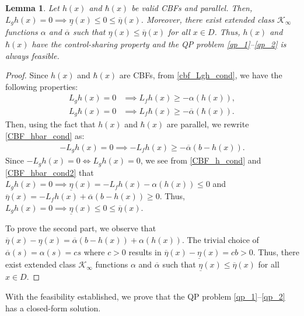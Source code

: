 \documentclass[letterpaper, 10 pt, conference]{ieeeconf}
\newtheorem{lemma}{Lemma}
\newcommand{\TODO}[1]{{\color{black}#1}}
\begin{document}
\begin{lemma}\label{lemma_feasible}
    Let $h(x)$ and $\hbar(x)$ be valid CBFs and parallel. Then, ${L_g h(x) = 0 \implies \underline{\eta}(x) \leq 0 \leq \overline{\eta}(x)}$. Moreover, there exist extended class $\mathcal{K}_{\infty}$ functions $\alpha$ and $\overline{\alpha}$ such that $\underline{\eta}(x) \leq \overline{\eta}(x)$ for all $x \in D$. Thus, $h(x)$ and $\hbar(x)$ have the control-sharing property and the QP problem \eqref{qp_1}--\eqref{qp_2} is always feasible.
\end{lemma}
\begin{proof}
    Since \TODO{$h(x)$ and $\hbar(x)$} 
    are CBFs, from \eqref{cbf_Lgh_cond}, we have the following properties:
    \begin{align}
            L_gh(x) = 0 &\implies L_fh(x) \geq -\alpha(h(x)),\label{CBF_h_cond}\\ 
            L_g\hbar(x) = 0 &\implies L_f\hbar(x) \geq -\overline{\alpha}(\hbar(x)).\label{CBF_hbar_cond}
    \end{align}
    Then, using the fact that $h(x)$ and $\hbar(x)$ are parallel, we rewrite \eqref{CBF_hbar_cond} as:
    \begin{align}
        -L_gh(x) = 0 \implies -L_fh(x) \geq -\overline{\alpha}(b - h(x))\label{CBF_hbar_cond2}.
    \end{align}
    Since ${-L_gh(x) = 0 \iff L_gh(x) = 0}$, we see from \eqref{CBF_h_cond} and \eqref{CBF_hbar_cond2} that $L_gh(x) = 0 \implies \underline{\eta}(x) = -L_fh(x) - \alpha(h(x)) \leq 0$ and $\overline{\eta}(x) = -L_fh(x) + \overline{\alpha}(b - h(x)) \geq 0$.
    Thus, $L_gh(x) = 0 \implies \underline{\eta}(x) \leq 0 \leq \overline{\eta}(x)$.
    
    To prove the second part, we observe that $ \overline{\eta}(x) - \underline{\eta}(x) = \overline{\alpha}(b-h(x)) + \alpha(h(x))$. The trivial choice of $\overline{\alpha}(s) = \alpha(s) = cs$ where $c > 0$ results in $\overline{\eta}(x) - \underline{\eta}(x) = cb > 0$. Thus, there exist extended class $\mathcal{K}_{\infty}$ functions $\alpha$ and $\overline{\alpha}$ such that $\underline{\eta}(x) \leq \overline{\eta}(x)$ for all $x \in D$.
\end{proof}

With the feasibility established, we prove that the QP problem \eqref{qp_1}--\eqref{qp_2} has a closed-form solution.
\end{document}
